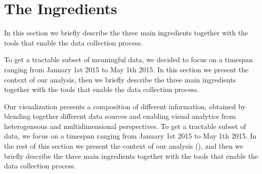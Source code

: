 %
%



\section{The Ingredients}\label{sec:blend-ingredients}

In this section we briefly describe the three main ingredients together with the tools that enable the data collection process.

To get a tractable subset of meaningful data, we decided to focus on a timespan ranging from January 1st 2015 to May 1th 2015.
In this section we present the context of our analysis, then we briefly describe the three main ingredients together with the tools that enable the data collection process.

Our visualization presents a composition of different information, obtained by blending together different data sources and enabling visual analytics from heterogeneous and multidimensional perspectives.
To get a tractable subset of data, we focus on a timespan ranging from January 1st 2015 to May 1th 2015.
In the rest of this section we present the context of our analysis (), and then we briefly describe the three main ingredients together with the tools that enable the data collection process.

